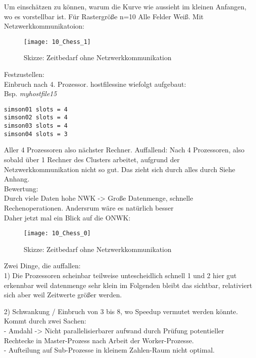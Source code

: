 \documentclass[
10pt, %
a4paper, %
oneside, %
headinclude,footinclude, %
BCOR5mm, %
]{scrartcl}
\begin{document}
Um einschätzen zu können, warum die Kurve wie aussieht im kleinen Anfangen, wo es vorstellbar ist. Für Rastergröße n=10 Alle Felder Weiß. Mit Netzwerkkommunikatoion:

\begin{figure}[h]
	\centering 
	\texttt{[image: 10\_Chess\_1]} 
	\caption[Skizze: Zeitbedarf ohne Netzwerkkommunikation]{Skizze: Zeitbedarf ohne Netzwerkkommunikation}
\end{figure}

Festzustellen: \\
Einbruch nach 4. Prozessor. hostfilessine wiefolgt aufgebaut:\\
Bsp. \textit{myhostfile15}\\

\begin{lstlisting}
simson01 slots = 4
simson02 slots = 4
simson03 slots = 4
simson04 slots = 3
\end{lstlisting}

Aller 4 Prozessoren also nächster Rechner. Auffallend: Nach 4 Prozessoren, also sobald über 1 Rechner des Clusters arbeitet, aufgrund der Netzwerkkommunikation nicht so gut.
Das zieht sich durch alles durch Siehe Anhang.\\

Bewertung:\\
Durch viele Daten hohe NWK -> 
Große Datenmenge, schnelle Rechenoperationen.
Andersrum wäre es natürlich besser\\

Daher jetzt mal ein Blick auf die ONWK:\\

\begin{figure}[h]
	\centering 
	\texttt{[image: 10\_Chess\_0]} 
	\caption[Skizze: Zeitbedarf ohne Netzwerkkommunikation]{Skizze: Zeitbedarf ohne Netzwerkkommunikation}
\end{figure}

Zwei Dinge, die auffallen:\\

1) Die Prozessoren scheinbar teilweise untescheidlich schnell
1 und 2 
hier gut erkennbar weil datenmenge sehr klein
im Folgenden bleibt das sichtbar, relativiert sich aber weil Zeitwerte größer werden.

2) Schwankung / Einbruch von 3 bis 8, wo Speedup vermutet werden könnte.\\ 
Kommt durch zwei Sachen:\\
 - Amdahl -> Nicht parallelisierbarer aufwand durch Prüfung potentieller Rechtecke in Master-Prozess nach Arbeit der Worker-Prozesse.\\
 - Aufteilung auf Sub-Prozesse in kleinem Zahlen-Raum nicht optimal.
\end{document}
